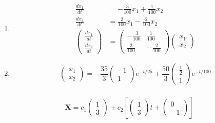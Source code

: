 \documentclass{article}
\begin{document}
\begin{enumerate}
  \item

        \begin{align*}
          \frac{d x_1}{d t}    & = -\frac{3}{100} x_1 + \frac{1}{100} x_2 \\
          \frac{d x_2}{d t}    & = \frac{2}{100} x_1 - \frac{2}{100} x_2  \\
          \begin{pmatrix}
            \frac{d x_1}{d t} \\
            \frac{d x_2}{d t}
          \end{pmatrix} & = \begin{pmatrix}
                              -\frac{3}{100} & \frac{1}{100}  \\
                              \frac{2}{100}  & -\frac{2}{100}
                            \end{pmatrix} \begin{pmatrix}
                                            x_1 \\
                                            x_2
                                          \end{pmatrix}
        \end{align*}

  \item

        \[\begin{pmatrix}
            x_1 \\
            x_2
          \end{pmatrix} = -\frac{35}{3} \begin{pmatrix}
            -1 \\
            1
          \end{pmatrix} e^{-t / 25} + \frac{50}{3} \begin{pmatrix}
            \frac{1}{2} \\
            1
          \end{pmatrix} e^{-t / 100}\]
\end{enumerate}

\setcounter{subsubsection}{20}
\subsubsection{}

\[\mathbf{X} = c_1 \begin{pmatrix}
    1 \\
    3
  \end{pmatrix} + c_2 \left[ \begin{pmatrix}
      1 \\
      3
    \end{pmatrix} t +
    \begin{pmatrix}
      0 \\
      -1
    \end{pmatrix} \right]\]
\end{document}
